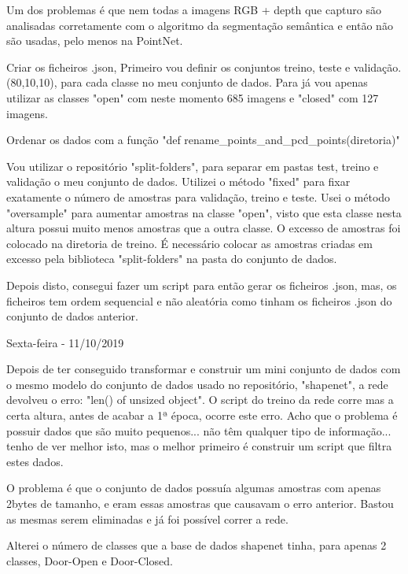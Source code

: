        Um dos problemas é que nem todas a imagens RGB + depth que capturo são analisadas corretamente com o algoritmo da segmentação semântica e então não são usadas, pelo menos na PointNet. 
        
        Criar os ficheiros .json,
            Primeiro vou definir os conjuntos treino, teste e validação. (80,10,10), para cada classe no meu conjunto de dados. Para já vou apenas utilizar as classes "open" com neste momento 685 imagens e "closed" com 127 imagens. 
            
            Ordenar os dados com a função "def rename\_points\_and\_pcd\_points(diretoria)"
            
            Vou utilizar o repositório "split-folders", para separar em pastas test, treino e validação o meu conjunto de dados. Utilizei o método "fixed" para fixar exatamente o número de amostras para validação, treino e teste. Usei o método "oversample" para aumentar amostras na classe "open", visto que esta classe nesta altura possui muito menos amostras que a outra classe. O excesso de amostras foi colocado na diretoria de treino. É necessário colocar as amostras criadas em excesso pela biblioteca "split-folders" na pasta do conjunto de dados.
            
            Depois disto, consegui fazer um script para então gerar os ficheiros .json, mas, os ficheiros tem ordem sequencial e não aleatória como tinham os ficheiros .json do conjunto de dados anterior.
        
            
        \bigskip
        
        Sexta-feira - 11/10/2019
        
        Depois de ter conseguido transformar e construir um mini conjunto de dados com o mesmo modelo do conjunto de dados usado no repositório, "shapenet", a rede devolveu o erro: "len() of unsized object". O script do treino da rede corre mas a certa altura, antes de acabar a 1ª época, ocorre este erro. Acho que o problema é possuir dados que são muito pequenos... não têm qualquer tipo de informação... tenho de ver melhor isto, mas o melhor primeiro é construir um script que filtra estes dados.
        
        O problema é que o conjunto de dados possuía algumas amostras com apenas 2bytes de tamanho, e eram essas amostras que causavam o erro anterior. Bastou as mesmas serem eliminadas e já foi possível correr a rede. 
        
        Alterei o número de classes que a base de dados shapenet tinha, para apenas 2 classes, Door-Open e Door-Closed.
        
